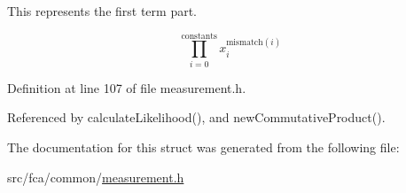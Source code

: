 \-This represents the first term part. 

\[ \prod_{i=0}^{\mathrm{constants}} x_i^{\mathrm{mismatch}(i)} \] 

\-Definition at line 107 of file measurement.\-h.



\-Referenced by calculate\-Likelihood(), and new\-Commutative\-Product().



\-The documentation for this struct was generated from the following file\-:\begin{DoxyCompactItemize}
\item 
src/fca/common/\hyperlink{common_2measurement_8h}{measurement.\-h}\end{DoxyCompactItemize}
